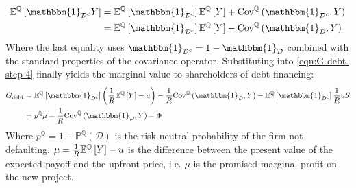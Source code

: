 \documentclass[../main.tex]{subfiles}
\begin{document}
            \begin{align*}
                \mathbb{E}^{\mathbb{Q}}\left[
                    \mathbbm{1}_{\mathcal{D}^{c}}Y
                \right]
                &=
                \mathbb{E}^{\mathbb{Q}}\left[\mathbbm{1}_{\mathcal{D}^{c}}\right] 
                \mathbb{E}^{\mathbb{Q}}\left[Y\right] 
                + 
                \text{Cov}^{\mathbb{Q}}\left(\mathbbm{1}_{\mathcal{D}^{c}}, Y\right) 
                \\
                &=
                \mathbb{E}^{\mathbb{Q}}\left[\mathbbm{1}_{\mathcal{D}^{c}}\right] 
                \mathbb{E}^{\mathbb{Q}}\left[Y\right] 
                - 
                \text{Cov}^{\mathbb{Q}}\left(\mathbbm{1}_{\mathcal{D}}, Y\right) 
            \end{align*}
        Where the last equality uses $\mathbbm{1}_{\mathcal{D}^{c}} = 1 - \mathbbm{1}_{\mathcal{D}}$ 
        combined with the standard properties of the covariance operator.
        Substituting into \cref{eqn:G-debt-step-4} finally yields the marginal value to shareholders of debt financing:
            \begin{align}
                G_{\text{debt}} &=
                \mathbb{E}^{\mathbb{Q}}\left[\mathbbm{1}_{\mathcal{D}^{c}}\right] 
                \left(
                    \discountfactor
                    \mathbb{E}^{\mathbb{Q}}\left[Y\right] 
                    - u
                \right)
                -
                \discountfactor
                \text{Cov}^{\mathbb{Q}}\left(\mathbbm{1}_{\mathcal{D}}, Y\right) 
                - 
                \mathbb{E}^{\mathbb{Q}}\left[
                    \mathbbm{1}_{\mathcal{D}^{c}}
                \right] \discountfactor u S
                \nonumber \\
                &= 
                p^{\mathbb{Q}} \mu 
                - \discountfactor 
                \text{Cov}^{\mathbb{Q}}\left(
                    \mathbbm{1}_{\mathcal{D}}, 
                    Y
                \right) 
                - \Phi
                \label{eqn:marginal-shareholder-value-debt-financing}
            \end{align}
        Where $p^{\mathbb{Q}} = 1 - \mathbb{P}^{\mathbb{Q}}\left(\mathcal{D}\right)$ 
        is the risk-neutral probability of the firm not defaulting. 
        $\mu = \frac{1}{R} \mathbb{E}^{\mathbb{Q}}\left[Y\right] - u$ 
        is the difference between the present value of the expected payoff and the upfront price, 
        i.e. $\mu$ is the promised marginal profit on the new project. 
\end{document}

